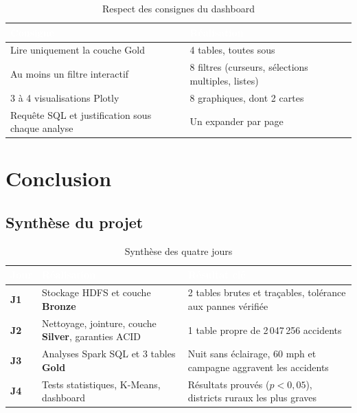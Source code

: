 \documentclass[11pt,a4paper]{report}
\newcommand{\hd}[1]{\textcolor{white}{\bfseries #1}}
\newcommand{\headrow}{\rowcolor{primary}}
\newcommand{\code}[1]{\texttt{\detokenize{#1}}}
\begin{document}
\begin{table}[H]
\centering
{}
\begin{tabularx}{\textwidth}{@{}X X@{}}
\toprule
\headrow \hd{Consigne} & \hd{Réalisation} \\
\midrule
Lire uniquement la couche Gold & 4 tables, toutes sous \code{/lakehouse/gold/} \\
Au moins un filtre interactif & 8 filtres (curseurs, sélections multiples, listes) \\
3 à 4 visualisations Plotly & 8 graphiques, dont 2 cartes \\
Requête SQL et justification sous chaque analyse & Un expander par page \\
\bottomrule
\end{tabularx}
\caption{Respect des consignes du dashboard}
\end{table}

\chapter{Conclusion}

\section{Synthèse du projet}

\begin{table}[H]
\centering
{}
\begin{tabularx}{\textwidth}{@{}l X X@{}}
\toprule
\headrow \hd{Jour} & \hd{Réalisation} & \hd{Résultat clé} \\
\midrule
\textbf{J1} & Stockage HDFS et couche \textcolor{bronzec}{\bfseries Bronze} & 2 tables brutes et traçables, tolérance aux pannes vérifiée \\
\textbf{J2} & Nettoyage, jointure, couche \textcolor{silverc!70!black}{\bfseries Silver}, garanties ACID & 1 table propre de 2\,047\,256 accidents \\
\textbf{J3} & Analyses Spark SQL et 3 tables \textcolor{goldc!80!black}{\bfseries Gold} & Nuit sans éclairage, 60 mph et campagne aggravent les accidents \\
\textbf{J4} & Tests statistiques, K-Means, dashboard & Résultats prouvés ($p < 0{,}05$), districts ruraux les plus graves \\
\bottomrule
\end{tabularx}
\caption{Synthèse des quatre jours}
\end{table}
\end{document}
